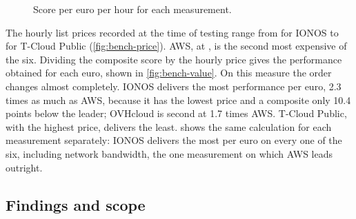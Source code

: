 \begin{figure}[htbp]
  \caption{Score per euro per hour for each measurement.}
  \label{fig:bench-value-metric}
\end{figure}

The hourly list prices recorded at the time of testing range from  for IONOS
to  for T-Cloud Public (\cref{fig:bench-price}). \acs{AWS}, at , is the second
most expensive of the six. Dividing the composite score by the hourly price gives
the performance obtained for each euro, shown in \cref{fig:bench-value}. On this
measure the order changes almost completely. IONOS delivers the most performance
per euro, 2.3 times as much as \acs{AWS}, because it has the lowest price and a
composite only 10.4 points below the leader; OVHcloud is second at 1.7 times
\acs{AWS}. T-Cloud Public, with the highest price, delivers the least.
 shows the same calculation for each measurement
separately: IONOS delivers the most per euro on every one of the six, including
network bandwidth, the one measurement on which \acs{AWS} leads outright.


\subsection{Findings and scope}
\label{sec:bench-findings}

